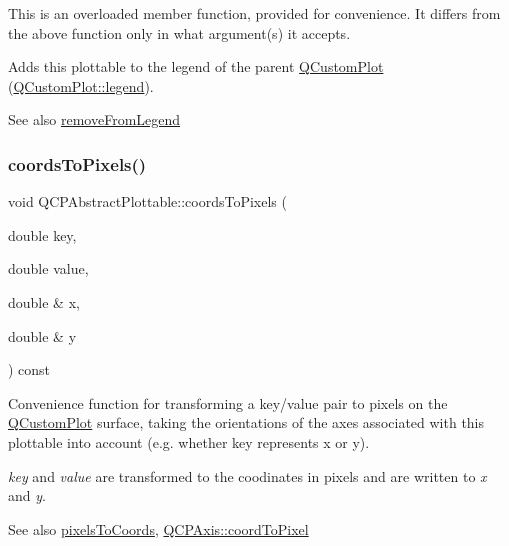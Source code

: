 This is an overloaded member function, provided for convenience. It differs from the above function only in what argument(s) it accepts.

Adds this plottable to the legend of the parent \mbox{\hyperlink{class_q_custom_plot}{Q\+Custom\+Plot}} (\mbox{\hyperlink{class_q_custom_plot_a4eadcd237dc6a09938b68b16877fa6af}{Q\+Custom\+Plot\+::legend}}).

\begin{DoxySeeAlso}{See also}
\mbox{\hyperlink{class_q_c_p_abstract_plottable_a3cc235007e2343a65ad4f463767e0e20}{remove\+From\+Legend}} 
\end{DoxySeeAlso}
\mbox{\label{class_q_c_p_abstract_plottable_a7ad84a36472441cf1f555c5683d0da93}} 
\subsubsection{\texorpdfstring{coords\+To\+Pixels()}{coordsToPixels()}\hspace{0.1cm}{\footnotesize\ttfamily [1/2]}}
{\footnotesize\ttfamily void Q\+C\+P\+Abstract\+Plottable\+::coords\+To\+Pixels (\begin{DoxyParamCaption}\item[{double}]{key,  }\item[{double}]{value,  }\item[{double \&}]{x,  }\item[{double \&}]{y }\end{DoxyParamCaption}) const}

Convenience function for transforming a key/value pair to pixels on the \mbox{\hyperlink{class_q_custom_plot}{Q\+Custom\+Plot}} surface, taking the orientations of the axes associated with this plottable into account (e.\+g. whether key represents x or y).

{\itshape key} and {\itshape value} are transformed to the coodinates in pixels and are written to {\itshape x} and {\itshape y}.

\begin{DoxySeeAlso}{See also}
\mbox{\hyperlink{class_q_c_p_abstract_plottable_a3903c1120ab5c27e7fa46b597ef267bd}{pixels\+To\+Coords}}, \mbox{\hyperlink{class_q_c_p_axis_af15d1b3a7f7e9b53d759d3ccff1fe4b4}{Q\+C\+P\+Axis\+::coord\+To\+Pixel}} 
\end{DoxySeeAlso}
\mbox{\label{class_q_c_p_abstract_plottable_a5acb50ae984eef09a7ab92315d2ad708}} 
